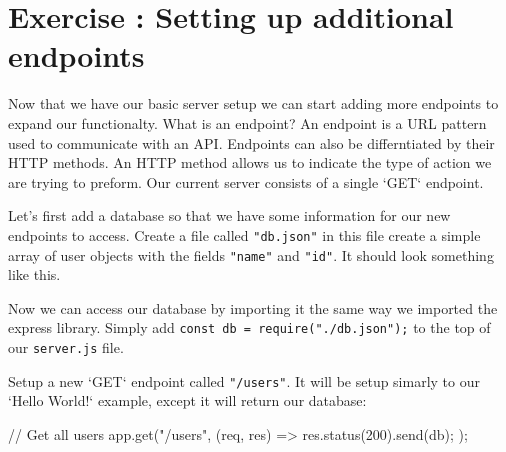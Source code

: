\documentclass{42-en}
\begin{document}

\newpage
\nextexercice


\chapter{Exercise \exercicenumber: Setting up additional endpoints}

    Now that we have our basic server setup we can start adding more endpoints to expand our functionalty. What is an endpoint? An endpoint is a URL pattern used to communicate with an API. Endpoints can also be differntiated by their HTTP methods. An HTTP method allows us to indicate the type of action we are trying to preform. Our current server consists of a single `GET` endpoint.


    Let's first add a database so that we have some information for our new endpoints to access. Create a file called \texttt{"db.json"} in this file create a simple array of user objects with the fields \texttt{"name"} and \texttt{"id"}. It should look something like this.
\begin{42jscode}
\end{42jscode}

    Now we can access our database by importing it the same way we imported the express library. Simply add \texttt{const db = require("./db.json");} to the top of our \texttt{server.js} file.

    Setup a new `GET` endpoint called \texttt{"/users"}. It will be setup simarly to our `Hello World!` example, except it will return our database:
\begin{42jscode}
// Get all users
app.get("/users", (req, res) => {
    res.status(200).send(db);
});
\end{42jscode}
\end{document}

